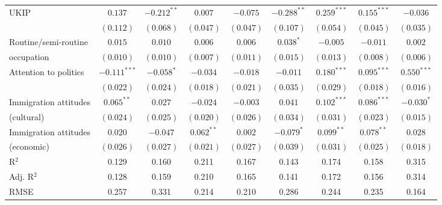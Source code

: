 \documentclass[12pt, letter]{article}
\begin{document}
\begin{table}
\begin{center}
{\begin{tabular}{l c c c c c c c c }
UKIP                             & $0.137$        & $-0.212^{**}$  & $0.007$        & $-0.075$       & $-0.288^{**}$  & $0.259^{***}$  & $0.155^{***}$  & $-0.036$       \\
                                 & $(0.112)$      & $(0.068)$      & $(0.047)$      & $(0.047)$      & $(0.107)$      & $(0.054)$      & $(0.045)$      & $(0.035)$      \\
Routine/semi-routine   & $0.015$        & $0.010$        & $0.006$        & $0.006$        & $0.038^{*}$    & $-0.005$       & $-0.011$       & $0.002$        \\
occupation                                 & $(0.010)$      & $(0.010)$      & $(0.007)$      & $(0.011)$      & $(0.015)$      & $(0.013)$      & $(0.008)$      & $(0.006)$      \\
Attention to politics            & $-0.111^{***}$ & $-0.058^{*}$   & $-0.034$       & $-0.018$       & $-0.011$       & $0.180^{***}$  & $0.095^{***}$  & $0.550^{***}$  \\
                                 & $(0.022)$      & $(0.024)$      & $(0.018)$      & $(0.021)$      & $(0.035)$      & $(0.029)$      & $(0.018)$      & $(0.016)$      \\
Immigration attitudes & $0.065^{**}$   & $0.027$        & $-0.024$       & $-0.003$       & $0.041$        & $0.102^{***}$  & $0.086^{***}$  & $-0.030^{*}$   \\
 (cultural)                     & $(0.024)$      & $(0.025)$      & $(0.020)$      & $(0.026)$      & $(0.034)$      & $(0.031)$      & $(0.023)$      & $(0.015)$      \\
Immigration attitudes  & $0.020$        & $-0.047$       & $0.062^{**}$   & $0.002$        & $-0.079^{*}$   & $0.099^{**}$   & $0.078^{**}$   & $0.028$        \\
(economic)                          & $(0.026)$      & $(0.027)$      & $(0.021)$      & $(0.027)$      & $(0.039)$      & $(0.031)$      & $(0.025)$      & $(0.018)$      \\
\hline
R$^2$                            & 0.129          & 0.160          & 0.211          & 0.167          & 0.143          & 0.174          & 0.158          & 0.315          \\
Adj. R$^2$                       & 0.128          & 0.159          & 0.210          & 0.165          & 0.141          & 0.172          & 0.156          & 0.314          \\
RMSE                             & 0.257          & 0.331          & 0.214          & 0.210          & 0.286          & 0.244          & 0.235          & 0.164          \\

\end{tabular}}
\end{center}
\end{table}
\end{document}
